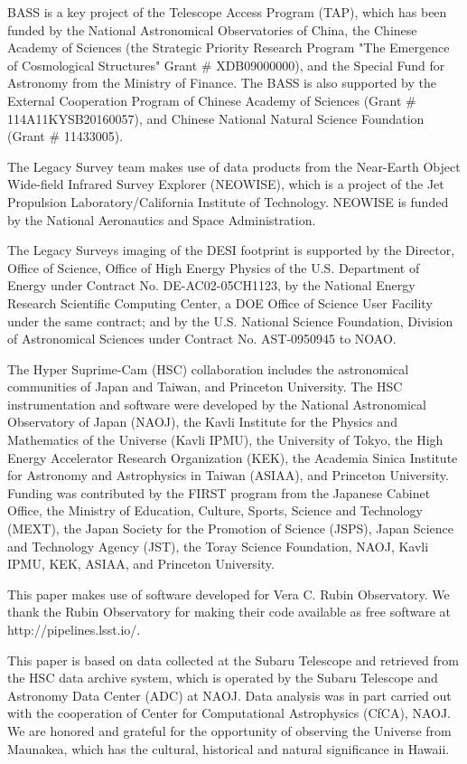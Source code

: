 \documentclass{raa}
\begin{document}
\begin{acknowledgements}
BASS is a key project of the Telescope Access Program (TAP), which has been funded by the National Astronomical Observatories of China, the Chinese Academy of Sciences (the Strategic Priority Research Program "The Emergence of Cosmological Structures" Grant \# XDB09000000), and the Special Fund for Astronomy from the Ministry of Finance. The BASS is also supported by the External Cooperation Program of Chinese Academy of Sciences (Grant \# 114A11KYSB20160057), and Chinese National Natural Science Foundation (Grant \# 11433005).

The Legacy Survey team makes use of data products from the Near-Earth Object Wide-field Infrared Survey Explorer (NEOWISE), which is a project of the Jet Propulsion Laboratory/California Institute of Technology. NEOWISE is funded by the National Aeronautics and Space Administration.

The Legacy Surveys imaging of the DESI footprint is supported by the Director, Office of Science, Office of High Energy Physics of the U.S. Department of Energy under Contract No. DE-AC02-05CH1123, by the National Energy Research Scientific Computing Center, a DOE Office of Science User Facility under the same contract; and by the U.S. National Science Foundation, Division of Astronomical Sciences under Contract No. AST-0950945 to NOAO.

The Hyper Suprime-Cam (HSC) collaboration includes the astronomical communities of Japan and Taiwan, and Princeton University. The HSC instrumentation and software were developed by the National Astronomical Observatory of Japan (NAOJ), the Kavli Institute for the Physics and Mathematics of the Universe (Kavli IPMU), the University of Tokyo, the High Energy Accelerator Research Organization (KEK), the Academia Sinica Institute for Astronomy and Astrophysics in Taiwan (ASIAA), and Princeton University. Funding was contributed by the FIRST program from the Japanese Cabinet Office, the Ministry of Education, Culture, Sports, Science and Technology (MEXT), the Japan Society for the Promotion of Science (JSPS), Japan Science and Technology Agency (JST), the Toray Science Foundation, NAOJ, Kavli IPMU, KEK, ASIAA, and Princeton University. 

This paper makes use of software developed for Vera C. Rubin Observatory. We thank the Rubin Observatory for making their code available as free software at http://pipelines.lsst.io/.

This paper is based on data collected at the Subaru Telescope and retrieved from the HSC data archive system, which is operated by the Subaru Telescope and Astronomy Data Center (ADC) at NAOJ. Data analysis was in part carried out with the cooperation of Center for Computational Astrophysics (CfCA), NAOJ. We are honored and grateful for the opportunity of observing the Universe from Maunakea, which has the cultural, historical and natural significance in Hawaii. 

\end{acknowledgements}
\end{document}
